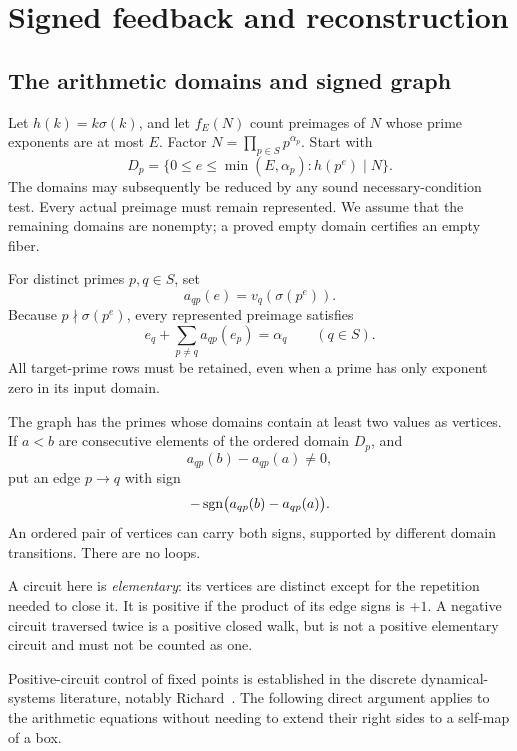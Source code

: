 \chapter{Signed feedback and reconstruction}\label{ch:signed}
\section{The arithmetic domains and signed graph}
Let $h(k)=k\sigma(k)$, and let $f_E(N)$ count preimages of $N$ whose prime exponents are at most $E$. Factor $N=\prod_{p\in S}p^{\alpha_p}$. Start with
\[
 D_p=\{0\le e\le\min(E,\alpha_p):h(p^e)\mid N\}.
\]
The domains may subsequently be reduced by any sound necessary-condition test. Every actual preimage must remain represented. We assume that the remaining domains are nonempty; a proved empty domain certifies an empty fiber.

For distinct primes $p,q\in S$, set
\[
 a_{qp}(e)=v_q(\sigma(p^e)).
\]
Because $p\nmid\sigma(p^e)$, every represented preimage satisfies
\begin{equation}\label{signed:eq:rows}
 e_q+\sum_{p\ne q}a_{qp}(e_p)=\alpha_q\qquad(q\in S).
\end{equation}
All target-prime rows must be retained, even when a prime has only exponent zero in its input domain.

The graph has the primes whose domains contain at least two values as vertices. If $a<b$ are consecutive elements of the ordered domain $D_p$, and
\[
 a_{qp}(b)-a_{qp}(a)\ne0,
\]
put an edge $p\to q$ with sign
\begin{equation}\label{signed:eq:edge}
 -\operatorname{sgn}\bigl(a_{qp}(b)-a_{qp}(a)\bigr).
\end{equation}
An ordered pair of vertices can carry both signs, supported by different domain transitions. There are no loops.

A circuit here is \emph{elementary}: its vertices are distinct except for the repetition needed to close it. It is positive if the product of its edge signs is $+1$. A negative circuit traversed twice is a positive closed walk, but is not a positive elementary circuit and must not be counted as one.

Positive-circuit control of fixed points is established in the discrete dynamical-systems literature, notably Richard~\cite{richard2009}. The following direct argument applies to the arithmetic equations without needing to extend their right sides to a self-map of a box.


